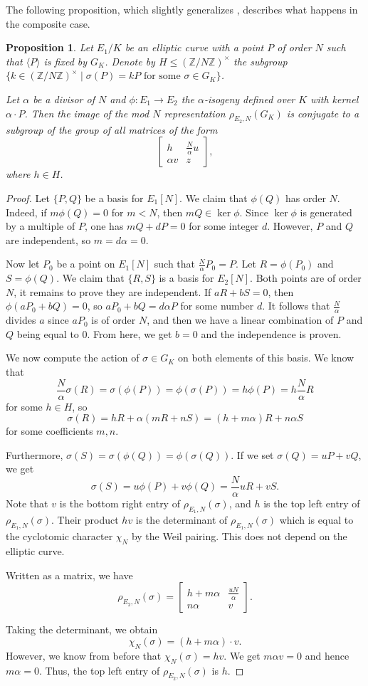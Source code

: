 \documentclass[10pt,leqno]{amsart}
\newcommand\m[1]{\begin{bmatrix}#1\end{bmatrix}}
\newcommand{\Z}{\mathbb{Z}}
\newtheorem{proposition}[theorem]{Proposition}
\theoremstyle{definition}
\theoremstyle{remark}
\numberwithin{theorem}{section}
\begin{document}
The following proposition, which slightly generalizes \cite[Proposition 4.4.]{bourdon-najman},  describes what happens in the composite case.


\begin{proposition}\label{izogenije-generalno}
    Let $E_1/K$ be an elliptic curve with a point $P$ of order $N$ such that $\langle P \rangle$ is fixed by $G_K$. Denote by $H \leq (\Z /N\Z)^\times$ the subgroup $\{k \in (\Z/N\Z)^\times \mid \sigma(P)=kP \text{ for some } \sigma \in G_K\}$. 
    
    Let $\alpha$ be a divisor of $N$ and $\phi:E_1 \to E_2$ the  $\alpha$-isogeny defined over $K$ with kernel $\alpha\cdot P$. Then the image of the mod $N$ representation $\rho_{E_2, N}(G_K)$ is conjugate to a subgroup of the group of all matrices of the form $$\m{ h & \frac{N}{\alpha}u \\ \alpha v & z},$$ where $h \in H$.
\end{proposition}

\begin{proof}
    Let $\{P, Q\}$ be a basis for $E_1[N]$. We claim that $\phi(Q)$ has order $N$. Indeed, if $m\phi(Q)=0$ for $m<N$, then $mQ\in \ker \phi$. Since $\ker \phi$ is generated by a multiple of $P$, one has $mQ+d P=0$ for some integer $d$. However, $P$ and $Q$ are independent, so $m=d\alpha=0$. 

    Now let $P_0$ be a point on $E_1[N]$ such that $\frac{N}{\alpha} P_0=P$. Let $R=\phi(P_0)$ and $S=\phi(Q)$. We claim that $\{R,S\}$ is a basis for $E_2[N]$. Both points are of order $N$, it remains to prove they are independent. If $aR+bS=0$, then $\phi(aP_0+bQ)=0$, so $aP_0+bQ=d\alpha P$ for some number $d$. It follows that $\frac{N}{\alpha}$ divides $a$ since $aP_0$ is of order $N$, and then we have a linear combination of $P$ and $Q$ being equal to $0$. From here, we get $b=0$ and the independence is proven. 
    
    
    We now compute the action of $\sigma \in G_K$ on both elements of this basis. We know that $$\frac{N}{\alpha}\sigma(R)=\sigma(\phi(P))=\phi(\sigma(P))=h\phi(P)=h \frac{N}{\alpha} R$$ for some $h \in H$,  so $$\sigma(R)=hR+\alpha (mR+nS)=(h+m\alpha)R+n\alpha S$$ for some coefficients $m,n$.

    Furthermore, $\sigma(S)=\sigma(\phi(Q))=\phi(\sigma(Q))$. If we set $\sigma(Q)=uP+vQ$, we get $$\sigma(S)=u\phi(P)+v\phi(Q)=\frac{N}{\alpha}uR+vS.$$
    Note that  $v$ is the bottom right entry of $\rho_{E_1, N}(\sigma)$, and $h$ is the top left entry of $\rho_{E_1, N}(\sigma)$. Their product $hv$ is the determinant of $\rho_{E_1, N}(\sigma)$ which is equal to the cyclotomic character $\chi_N$ by the Weil pairing. This does not depend on the elliptic curve.

  
    Written as a matrix, we have $$\rho_{E_2, N}(\sigma)=\m{h+m\alpha & \frac{uN}{\alpha} \\ n\alpha & v}.$$

    Taking the determinant, we obtain $$\chi_N(\sigma)=(h+m\alpha)\cdot v.$$ 
    However, we know from before that $\chi_N(\sigma)=hv$. We get $m\alpha v=0$ and hence $m\alpha=0$. Thus, the top left entry of $\rho_{E_2, N}(\sigma)$ is $h$.
\end{proof}
\end{document}

